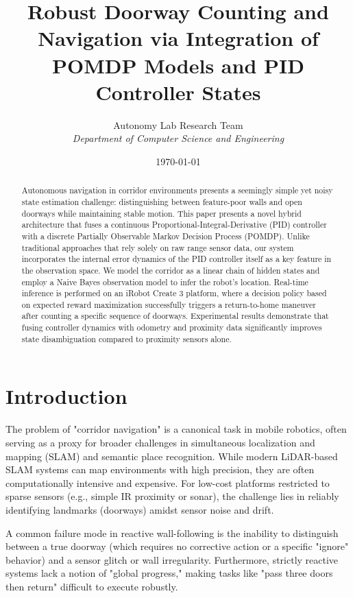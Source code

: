 \documentclass[10pt, twocolumn]{article}
\title{\textbf{Robust Doorway Counting and Navigation via Integration of POMDP Models and PID Controller States}}
\author{Autonomy Lab Research Team \\ \textit{Department of Computer Science and Engineering}}
\date{\today}
\begin{document}
\maketitle

\begin{abstract}
Autonomous navigation in corridor environments presents a seemingly simple yet noisy state estimation challenge: distinguishing between feature-poor walls and open doorways while maintaining stable motion. This paper presents a novel hybrid architecture that fuses a continuous Proportional-Integral-Derivative (PID) controller with a discrete Partially Observable Markov Decision Process (POMDP). Unlike traditional approaches that rely solely on raw range sensor data, our system incorporates the internal error dynamics of the PID controller itself as a key feature in the observation space. We model the corridor as a linear chain of hidden states and employ a Naive Bayes observation model to infer the robot's location. Real-time inference is performed on an iRobot Create 3 platform, where a decision policy based on expected reward maximization successfully triggers a return-to-home maneuver after counting a specific sequence of doorways. Experimental results demonstrate that fusing controller dynamics with odometry and proximity data significantly improves state disambiguation compared to proximity sensors alone.
\end{abstract}

\section{Introduction}
The problem of "corridor navigation" is a canonical task in mobile robotics, often serving as a proxy for broader challenges in simultaneous localization and mapping (SLAM) and semantic place recognition. While modern LiDAR-based SLAM systems can map environments with high precision, they are often computationally intensive and expensive. For low-cost platforms restricted to sparse sensors (e.g., simple IR proximity or sonar), the challenge lies in reliably identifying landmarks (doorways) amidst sensor noise and drift.

A common failure mode in reactive wall-following is the inability to distinguish between a true doorway (which requires no corrective action or a specific "ignore" behavior) and a sensor glitch or wall irregularity. Furthermore, strictly reactive systems lack a notion of "global progress," making tasks like "pass three doors then return" difficult to execute robustly.
\end{document}
